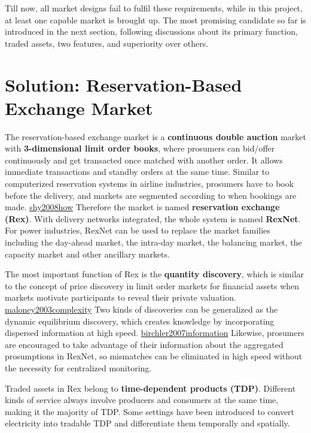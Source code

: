 \documentclass[letterpaper,8pt,twocolumn,twoside,]{pinp}
\begin{document}
Till now, all market designs fail to fulfil these requirements, while in
this project, at least one capable market is brought up. The most
promising candidate so far is introduced in the next section, following
discussions about its primary function, traded assets, two features, and
superiority over others.

\hypertarget{solution-reservation-based-exchange-market}{%
\section{Solution: Reservation-Based Exchange
Market}\label{solution-reservation-based-exchange-market}}

The reservation-based exchange market is a \textbf{continuous double
auction} market with \textbf{3-dimensional limit order books}, where
prosumers can bid/offer continuously and get transacted once matched
with another order. It allows immediate transactions and standby orders
at the same time. Similar to computerized reservation systems in airline
industries, prosumers have to book before the delivery, and markets are
segmented according to when bookings are made.
\protect\hyperlink{reference}{shy2008how} Therefore the market is named
\textbf{reservation exchange (Rex)}. With delivery networks integrated,
the whole system is named \textbf{RexNet}. For power industries, RexNet
can be used to replace the market families including the day-ahead
market, the intra-day market, the balancing market, the capacity market
and other ancillary markets.

The most important function of Rex is the \textbf{quantity discovery},
which is similar to the concept of price discovery in limit order
markets for financial assets when markets motivate participants to
reveal their private valuation.
\protect\hyperlink{reference}{maloney2003complexity} Two kinds of
discoveries can be generalized as the dynamic equilibrium discovery,
which creates knowledge by incorporating dispersed information at high
speed. \protect\hyperlink{reference}{birchler2007information} Likewise,
prosumers are encouraged to take advantage of their information about
the aggregated prosumptions in RexNet, so mismatches can be eliminated
in high speed without the necessity for centralized monitoring.

Traded assets in Rex belong to \textbf{time-dependent products (TDP)}.
Different kinds of service always involve producers and consumers at the
same time, making it the majority of TDP. Some settings have been
introduced to convert electricity into tradable TDP and differentiate
them temporally and spatially.
\end{document}
